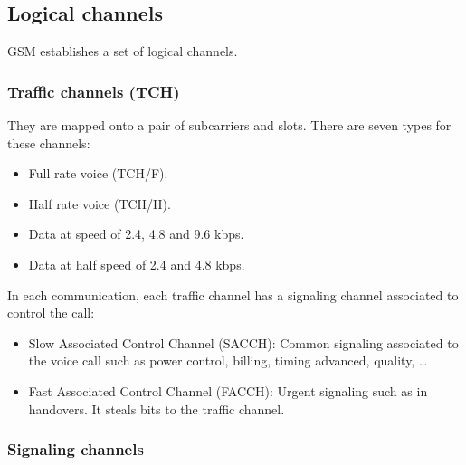 \documentclass[../main.tex]{subfiles}
\begin{document}
\subsection{Logical channels}

GSM establishes a set of logical channels.

\subsubsection{Traffic channels (TCH)}

They are mapped onto a pair of subcarriers and slots. There are seven types for these channels:
\begin{itemize}
	\item Full rate voice (TCH/F).
	\item Half rate voice (TCH/H).
	\item Data at speed of 2.4, 4.8 and 9.6 kbps.
	\item Data at half speed of 2.4 and 4.8 kbps.
\end{itemize}

In each communication, each traffic channel has a signaling channel associated to control the call:
\begin{itemize}
	\item Slow Associated Control Channel (SACCH): Common signaling associated to the voice call such as power control, billing, timing advanced, quality, \ldots
	\item Fast Associated Control Channel (FACCH): Urgent signaling such as in handovers. It steals bits to the traffic channel.
\end{itemize}

\subsubsection{Signaling channels}
\end{document}
